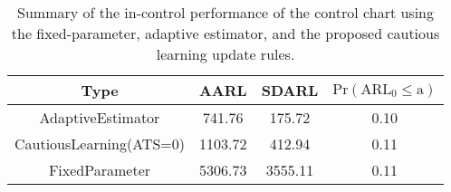 \begin{table}[!h]

\caption{Summary of the in-control performance of the control chart using the fixed-parameter, adaptive estimator, and the proposed cautious learning update rules.}
\centering
\begin{tabular}[t]{cccc}
\toprule
Type & AARL & SDARL & $\text{Pr}(\text{ARL}_0 \leq \text{a})$\\
\midrule
AdaptiveEstimator & 741.76 & 175.72 & 0.10\\
CautiousLearning(ATS=0) & 1103.72 & 412.94 & 0.11\\
FixedParameter & 5306.73 & 3555.11 & 0.11\\
\bottomrule
\end{tabular}
\end{table}
